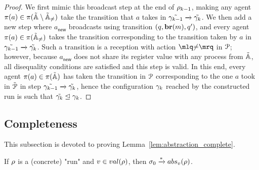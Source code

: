 \begin{proof}
	We first mimic this broadcast step at the end of $\rho_{k-1}$, making any agent $\pi(a) \in \pi(\tilde{\mathbb{A}} \setminus \tilde{\mathbb{A}}_{{\ne}})$ take the transition that $a$ takes in $\tilde{\gamma_{k-1}} \xrightarrow{} \tilde{\gamma_k}$. We then add a new step where $a_{\mathsf{new}}$ broadcasts using transition $(q, \textbf{br}(m), q')$, and every agent $\pi(a) \in \pi(\tilde{\mathbb{A}}_{{\ne}})$ takes the transition corresponding to the transition taken by $a$ in $\tilde{\gamma_{k-1}} \xrightarrow{} \tilde{\gamma_k}$. Such a transition is a reception with action $\quotemarks{\diseqtestact}$ in $\mathcal{P}$; however, because $a_{\mathsf{new}}$ does not share its register value with any process from $\tilde{\mathbb{A}}$, all disequality conditions are satisfied and this step is valid. In this end, every agent $\pi(a) \in \pi(\tilde{\mathbb{A}})$ has taken the transition in $\mathcal{P}$ corresponding to the one $a$ took in $\tilde{\mathcal{P}}$ in step $\tilde{\gamma_{k-1}} \xrightarrow{} \tilde{\gamma_k}$, hence the configuration $\gamma_k$ reached by the constructed run is such that $\tilde{\gamma_k} \trianglelefteq \gamma_k$. 
\end{proof}
\fi

\subsection{Completeness}
This subsection is devoted to proving Lemma~\ref{lem:abstraction_complete}.

\begin{lemma}
	\label{lem:abstraction_complete}
	If $\rho$ is a (concrete) "run" and $\aval \in \valsof{\run}$, then $\aconfiginit \step{*} \absproj{\aval}{\run}$. 
\end{lemma}




